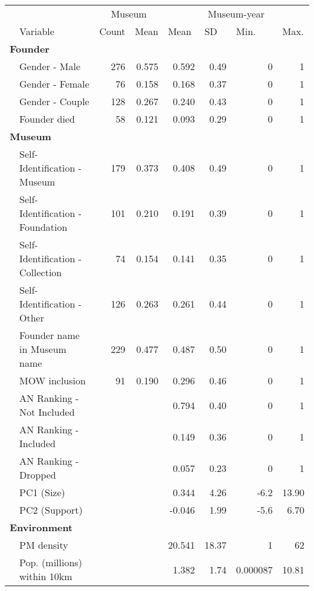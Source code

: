 \documentclass[12pt]{article}
\begin{document}
\begin{table}[ht]
\centering
\begin{tabular}{llrrrrrr}
  \hline
 & & \multicolumn{2}{c}{Museum} & \multicolumn{4}{c}{Museum-year} \\ 
\cmidrule(r){3-4}\cmidrule(r){5-8} \multicolumn{1}{l}{} & \multicolumn{1}{l}{Variable} & \multicolumn{1}{l}{Count} & \multicolumn{1}{l}{Mean} & \multicolumn{1}{l}{Mean} & \multicolumn{1}{l}{SD} & \multicolumn{1}{l}{Min.} & \multicolumn{1}{l}{Max.}\\ 
 \hline
  \multicolumn{8}{l}{\textbf{Founder}} \\ 
 & Gender - Male & 276 & 0.575 &  0.592 &  0.49 & 0 & 1 \\ 
   & Gender - Female & 76 & 0.158 &  0.168 &  0.37 & 0 & 1 \\ 
   & Gender - Couple & 128 & 0.267 &  0.240 &  0.43 & 0 & 1 \\ 
   & Founder died & 58 & 0.121 &  0.093 &  0.29 & 0 & 1 \\ 
   \multicolumn{8}{l}{\textbf{Museum}} \\ 
 & Self-Identification - Museum & 179 & 0.373 &  0.408 &  0.49 & 0 & 1 \\ 
   & Self-Identification - Foundation & 101 & 0.210 &  0.191 &  0.39 & 0 & 1 \\ 
   & Self-Identification - Collection & 74 & 0.154 &  0.141 &  0.35 & 0 & 1 \\ 
   & Self-Identification - Other & 126 & 0.263 &  0.261 &  0.44 & 0 & 1 \\ 
   & Founder name in Museum name & 229 & 0.477 &  0.487 &  0.50 & 0 & 1 \\ 
   & MOW inclusion & 91 & 0.190 &  0.296 &  0.46 & 0 & 1 \\ 
   & AN Ranking - Not Included &  &  &  0.794 &  0.40 & 0 & 1 \\ 
   & AN Ranking - Included &  &  &  0.149 &  0.36 & 0 & 1 \\ 
   & AN Ranking - Dropped &  &  &  0.057 &  0.23 & 0 & 1 \\ 
   & PC1 (Size) &  &  &  0.344 &  4.26 & -6.2 & 13.90 \\ 
   & PC2 (Support) &  &  & -0.046 &  1.99 & -5.6 & 6.70 \\ 
   \multicolumn{8}{l}{\textbf{Environment}} \\ 
 & PM density &  &  & 20.541 & 18.37 & 1 & 62 \\ 
   & Pop. (millions) within 10km &  &  &  1.382 &  1.74 & 0.000087 & 10.81 \\ 

\end{tabular}
\end{table}
\end{document}
